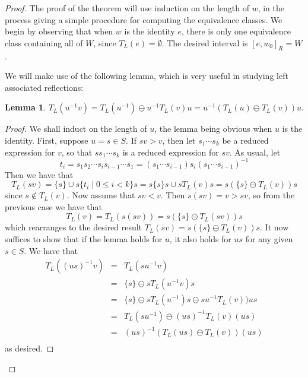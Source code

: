 \documentclass[11pt]{article}
\theoremstyle{definition}
\newtheorem{lemma}{Lemma}
\theoremstyle{definition}
\begin{document}
\begin{proof}
The proof of the theorem will use induction on the length of $w$, in the process giving a simple procedure for computing the equivalence classes. We begin by observing that when $w$ is the identity $e$, there is only one equivalence class containing all of $W$, since $T_L(e) = \emptyset$. The desired interval is $[e, w_0]_R = W$.

We will make use of the following lemma, which is very useful in studying left associated reflections:

\begin{lemma}
$T_L(u^{-1}v) = T_L(u^{-1}) \ominus u^{-1}T_L(v)u = u^{-1}(T_L(u) \ominus T_L(v))u$.
\end{lemma}
\begin{proof}
We shall induct on the length of $u$, the lemma being obvious when $u$ is the identity. First, suppose $u = s \in S$. If $sv > v$, then let $s_1\cdots s_k$ be a reduced expression for $v$, so that $ss_1\cdots s_k$ is a reduced expression for $sv$. As usual, let
\[
t_i = s_1s_2\cdots s_is_{i-1}\cdots s_1 = (s_1\cdots s_{i-1}) s_i (s_1\cdots s_{i-1})^{-1}
\]
Then we have that
\[
T_L(sv) = \{s\} \cup s\{t_i \mid 0\leq i < k\}s = s\{s\}s \cup sT_L(v)s = s(\{s\} \ominus T_L(v))s
\]
since $s \notin T_L(v)$. Now assume that $sv < v$. Then $s(sv) = v > sv$, so from the previous case we have that
\[
T_L(v) = T_L(s(sv)) = s(\{s\} \ominus T_L(sv))s
\]
which rearranges to the desired result $T_L(sv) = s(\{s\} \ominus T_L(v))s$. It now suffices to show that if the lemma holds for $u$, it also holds for $us$ for any given $s \in S$. We have that
\[
\begin{array} {lcl}
T_L((us)^{-1}v) &=& T_L(su^{-1}v)\\
&=& \{s\} \ominus sT_L(u^{-1}v)s\\
&=& \{s\} \ominus sT_L(u^{-1})s \ominus su^{-1}T_L(v))us\\
&=& T_L(su^{-1}) \ominus (us)^{-1}T_L(v)(us)\\
&=& (us)^{-1}(T_L(us) \ominus T_L(v))(us)\\
\end{array}
\]
as desired.
\end{proof}


\end{proof}
\end{document}
